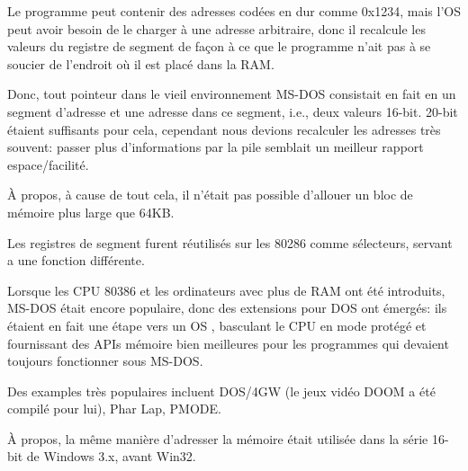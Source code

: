 Le programme peut contenir des adresses codées en dur comme 0x1234, mais l'\ac{OS}
peut avoir besoin de le charger à une adresse arbitraire, donc il recalcule les valeurs
du registre de segment de façon à ce que le programme n'ait pas à se soucier de
l'endroit où il est placé dans la RAM.

Donc, tout pointeur dans le vieil environnement MS-DOS consistait en fait en un segment
d'adresse et une adresse dans ce segment, i.e., deux valeurs 16-bit. 20-bit étaient
suffisants pour cela, cependant nous devions recalculer les adresses très souvent:
passer plus d'informations par la pile semblait un meilleur rapport espace/facilité.

À propos, à cause de tout cela, il n'était pas possible d'allouer un bloc de mémoire
plus large que 64KB.


Les registres de segment furent réutilisés sur les 80286 comme sélecteurs, servant
a une fonction différente.


Lorsque les CPU 80386 et les ordinateurs avec plus de \ac{RAM} ont été introduits,
MS-DOS était encore populaire, donc des extensions pour DOS ont émergés: ils étaient
en fait une étape vers un \ac{OS} , basculant le CPU en mode protégé et
fournissant des \ac{API}s mémoire bien meilleures pour les programmes qui devaient
toujours fonctionner sous MS-DOS.

Des examples très populaires incluent DOS/4GW (le jeux vidéo DOOM a été compilé pour
lui), Phar Lap, PMODE.
\par
{}

À propos, la même manière d'adresser la mémoire était utilisée dans la série 16-bit
de Windows 3.x, avant Win32.

